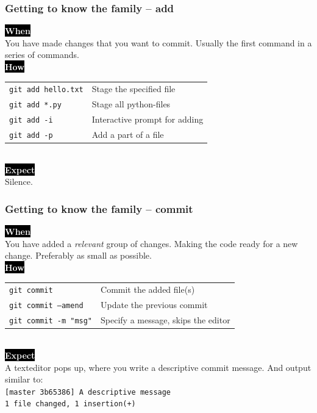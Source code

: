 \documentclass{beamer}
\newcommand{\keyword}[1]{\hspace{-1.0em}\colorbox{black}{\textcolor{white}{\textbf{#1}}}}
\begin{document}
\begin{frame}
  \frametitle{Getting to know the family -- add}
  \keyword{When}\\
    You have made changes that you want to commit.
    Usually the first command in a series of commands.
  \\ [0.5em]

  \keyword{How}\\
  \hspace{-1.0em}
  \begin{tabular}{ll}
    \texttt{git add hello.txt} & Stage the specified file \\
    \texttt{git add *.py} & Stage all python-files \\
    \texttt{git add -i} & Interactive prompt for adding \\
    \texttt{git add -p} & Add a part of a file \\
  \end{tabular}
  \\ [0.5em]

  \keyword{Expect}\\
  Silence.
\end{frame}

\begin{frame}
  \frametitle{Getting to know the family -- commit}
  \keyword{When}\\
    You have added a \emph{relevant} group of changes. Making
    the code ready for a new change. Preferably as small as possible.
  \\ [0.5em]

  \keyword{How}\\
  \hspace{-1.0em}
  \begin{tabular}{ll}
    \texttt{git commit} & Commit the added file(s) \\
    \texttt{git commit --amend} & Update the previous commit \\
    \texttt{git commit -m "msg"} & Specify a message, skips the editor \\
  \end{tabular}
  \\ [0.5em]

  \keyword{Expect}\\
  A texteditor pops up, where you write a descriptive commit message. And
  output similar to: \\
  \texttt{[master 3b65386] A descriptive message} \\
  \texttt{1 file changed, 1 insertion(+)}

\end{frame}
\end{document}
